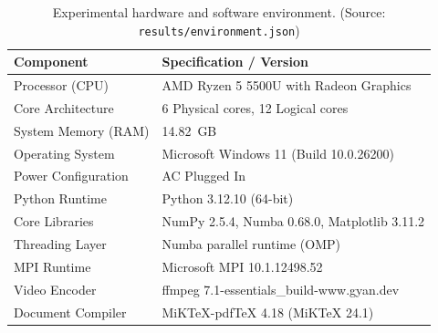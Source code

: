 \begin{table}[htbp]
\centering
\small
\caption{Experimental hardware and software environment. (Source: \texttt{results/environment.json})}
\label{tab:environment}
\begin{tabular}{ll}
\toprule
\textbf{Component} & \textbf{Specification / Version} \\
\midrule
Processor (CPU) & AMD Ryzen 5 5500U with Radeon Graphics \\
Core Architecture & 6 Physical cores, 12 Logical cores \\
System Memory (RAM) & 14.82~GB \\
Operating System & Microsoft Windows 11 (Build 10.0.26200) \\
Power Configuration & AC Plugged In \\
Python Runtime & Python 3.12.10 (64-bit) \\
Core Libraries & NumPy 2.5.4, Numba 0.68.0, Matplotlib 3.11.2 \\
Threading Layer & Numba parallel runtime (OMP) \\
MPI Runtime & Microsoft MPI 10.1.12498.52 \\
Video Encoder & ffmpeg 7.1-essentials\_build-www.gyan.dev \\
Document Compiler & MiKTeX-pdfTeX 4.18 (MiKTeX 24.1) \\
\bottomrule
\end{tabular}
\end{table}
